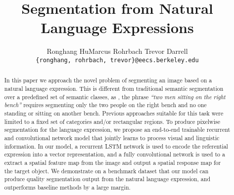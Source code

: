 \documentclass[runningheads]{llncs}
\begin{document}
 
\newcommand{\myparagraph}[1]{\vspace{-0.25cm} \paragraph{\textbf{\emph{#1}}}}

\newcommand{\ronghang}[1]{\textcolor{red}{Ronghang: #1}}
\newcommand{\marcus}[1]{\textcolor{green}{Marcus: #1}}
\newcommand{\trevor}[1]{\textcolor{blue}{Trevor: #1}}
\newcommand{\invisible}[1]{}

\newcommand{\figvspace}{\vspace{-.5cm}}
\newcommand{\secvspace}{\vspace{-.2cm}}
\newcommand{\subsecvspace}{\vspace{-.2cm}}

\graphicspath{{./fig/}{./fig/plots/}}
 \pagestyle{headings}
\mainmatter


\newcommand{\refexp}[1]{\emph{``#1''}}

\title{Segmentation from Natural Language Expressions} 



\author{
Ronghang Hu\quad Marcus Rohrbach \quad Trevor Darrell\\
\texttt{\{ronghang, rohrbach, trevor\}@eecs.berkeley.edu}
}



\maketitle

\begin{abstract}
In this paper we approach the novel problem of segmenting an image based on a natural language expression. This is different from traditional semantic segmentation over a predefined set of semantic classes, as \eg, the phrase \refexp{two men sitting on the right bench} requires segmenting only the two people on the right bench and no one standing or sitting on another bench. Previous approaches suitable for this task were limited to a fixed set of categories and/or rectangular regions. To produce pixelwise segmentation for the language expression, we propose an end-to-end trainable recurrent and convolutional network model that jointly learns to process visual and linguistic information. In our model, a recurrent LSTM network is used to encode the referential expression into a vector representation, and a fully convolutional network is used to a extract a spatial feature map from the image and output a spatial response map for the target object. We demonstrate on a benchmark dataset that our model can produce quality segmentation output from the natural language expression, and outperforms baseline methods by a large margin.
\end{abstract}
\end{document}
